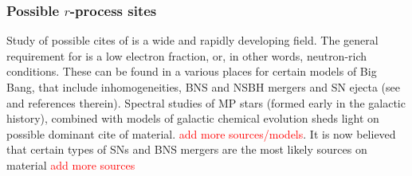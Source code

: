 

\subsubsection{Possible $r$-process sites}

Study of possible cites of \rproc{} is a wide and rapidly developing field. The general requirement 
for \rproc{} is a low electron fraction, or, in other words, neutron-rich conditions. These can be 
found in a various places for certain models of Big Bang, that include inhomogeneities, 
\ac{BNS} and \ac{NSBH} mergers and \ac{SN} ejecta (see \citet{Mathews:1990} and references therein). 
%
Spectral studies of \ac{MP} stars (formed early in the galactic history), combined with models of 
galactic chemical evolution sheds light on possible dominant cite of \rproc{} material. 
\textcolor{red}{add more sources/models}. 
It is now believed that certain types of \acp{SN} and \ac{BNS} mergers are the most likely 
sources on \rproc{} material \citep{Mathews:1990,Thielemann:2011} \textcolor{red}{add more sources}



